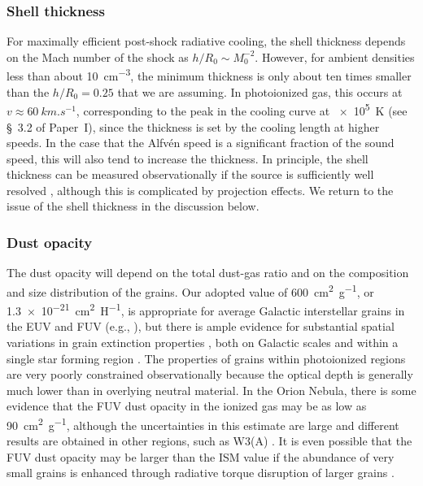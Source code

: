 \documentclass[useAMS, usenatbib, a4paper]{mnras}
\begin{document}
\subsubsection{Shell thickness}
\label{sec:shell-thickness}
For maximally efficient post-shock radiative cooling, the shell
thickness depends on the Mach number of the shock as
\(h / R_0 \sim M_0^{-2}\).  However, for ambient densities less than
about \SI{10}{cm^{-3}}, the minimum thickness is only about ten times
smaller than the \(h / R_0 = 0.25\) that we are assuming.  In
photoionized gas, this occurs at \(v \approx \SI{60}{km.s^{-1}}\),
corresponding to the peak in the cooling curve at \SI{e5}{K} (see
\S~3.2 of Paper~I),
since the thickness is set by the cooling length at higher speeds.  In
the case that the Alfv\'en speed is a significant fraction of the
sound speed, this will also tend to increase the thickness.  In
principle, the shell thickness can be measured observationally if the
source is sufficiently well resolved \citep{Kobulnicky:2017a},
although this is complicated by projection effects.  We return to the
issue of the shell thickness in the discussion below.

\subsubsection{Dust opacity}
\label{sec:dust-opacity}
The dust opacity will depend on the total dust-gas ratio and on the
composition and size distribution of the grains.  Our adopted value of
\SI{600}{cm^2.g^{-1}}, or \SI{1.3e-21}{cm^2.H^{-1}}, is appropriate
for average Galactic interstellar grains in the EUV and FUV (e.g.,
\citealp{Weingartner:2001a}), but there is ample evidence for
substantial spatial variations in grain extinction properties
\citep{Fitzpatrick:2007a}, both on Galactic scales
\citep{Schlafly:2016a} and within a single star forming region
\citep{Beitia-Antero:2017a}.  The properties of grains within
photoionized regions are very poorly constrained observationally
because the optical depth is generally much lower than in overlying
neutral material.  In the Orion Nebula, there is some evidence
\citep{Salgado:2016a} that the FUV dust opacity in the ionized gas may
be as low as \SI{90}{cm^2.g^{-1}}, although the uncertainties in this
estimate are large and different results are obtained in other
regions, such as W3(A) \citep{Salgado:2012a}.  It is even possible
that the FUV dust opacity may be larger than the ISM value if the
abundance of very small grains is enhanced through radiative torque
disruption of larger grains \citep{Hoang:2018a}.
\end{document}
